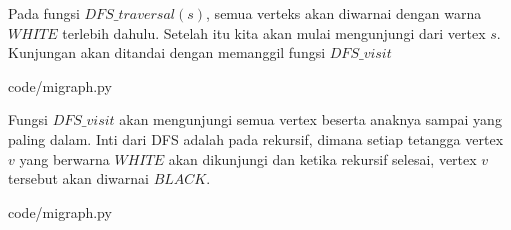 Pada fungsi $DFS\_traversal(s)$, semua verteks akan diwarnai dengan warna $WHITE$ terlebih dahulu. Setelah itu kita akan mulai mengunjungi dari vertex $s$. Kunjungan akan ditandai dengan memanggil fungsi $DFS\_visit$


                {code/migraph.py}

Fungsi $DFS\_visit$ akan mengunjungi semua vertex beserta anaknya sampai yang paling dalam. Inti dari DFS adalah pada rekursif, dimana setiap tetangga vertex $v$ yang berwarna $WHITE$ akan dikunjungi dan ketika rekursif selesai, vertex $v$ tersebut akan diwarnai $BLACK$.


                {code/migraph.py}

